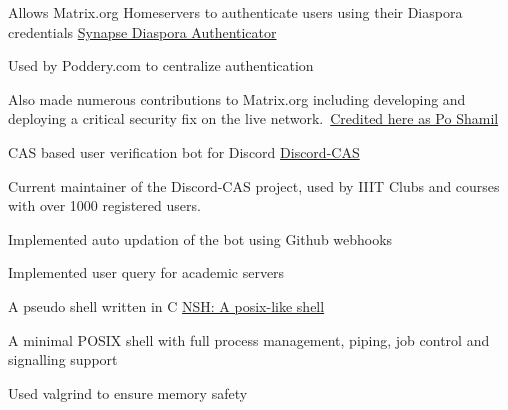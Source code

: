 \begin{cventries}
    \cventry
    {Allows Matrix.org Homeservers to authenticate users using their Diaspora credentials} %
    {\href{https://matrix.org/docs/projects/other/synapse-diaspora-auth}{Synapse Diaspora Authenticator}} %
    {} %
    {} %
    {
      \begin{cvitems} %
        \item {Used by Poddery.com to centralize authentication}
        \item {Also made numerous contributions to Matrix.org including developing and deploying a critical security fix on the live network.\
         \href{https://matrix.org/blog/2018/05/01/security-update-synapse-0-28-1/}{Credited here as Po Shamil}}
      \end{cvitems}
    }
    
    \cventry
    {CAS based user verification bot for Discord} %
    {\href{https://github.com/Opensource-IIITH/Discord-CAS}{Discord-CAS}} %
    {} %
    {} %
    {
      \begin{cvitems} %
        \item {Current maintainer of the Discord-CAS project, used by IIIT Clubs and courses with over 1000 registered users.}
        \item {Implemented auto updation of the bot using Github webhooks}
        \item {Implemented user query for academic servers}
      \end{cvitems}
    }
    
    \cventry
    {A pseudo shell written in C} %
    {\href{https://github.com/necessary129/nsh}{NSH: A posix-like shell}} %
    {} %
    {} %
    {
      \begin{cvitems} %
          \item {A minimal POSIX shell with full process management, piping, job control and signalling support}
          \item {Used valgrind to ensure memory safety}
      \end{cvitems}
    }
\end{cventries}
